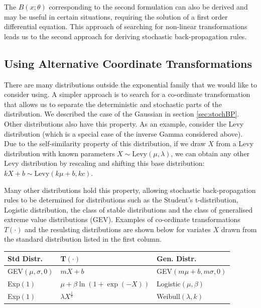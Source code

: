 \documentclass{article}
\begin{document}
\begin{bibunit}[icml2013]
The $B(x ;\theta)$ corresponding to the second formulation can also be derived and may be useful in certain situations, requiring the solution of a first order differential equation. This approach of searching for non-linear transformations leads us to the second approach for deriving stochastic back-propagation rules.

\subsection{Using Alternative Coordinate Transformations}
There are many distributions outside the exponential family that we would 
like to consider using. A simpler approach is to search for a co-ordinate 
transformation that allows us to separate the deterministic and stochastic 
parts of the distribution. We described the case of the Gaussian in section 
\ref{sec:stochBP}. Other distributions also have this property. As an 
example, consider the Levy distribution (which is a special case of the 
inverse Gamma considered above). Due to the self-similarity property of 
this distribution, if we draw $X$ from a Levy distribution with known 
parameters $X \sim \textrm{Levy}(\mu, \lambda)$, we can obtain any other Levy 
distribution by rescaling and shifting this base distribution: $kX + b \sim 
\textrm{Levy}(k\mu + b,kc)$.

Many other distributions hold this property, allowing stochastic back-propagation rules to be determined for distributions such as the Student's t-distribution, Logistic distribution, the class of stable distributions and the class of generalised extreme value distributions (GEV). Examples of co-ordinate transformations $T(\cdot)$ and the resulsting distributions are shown below for variates $X$ drawn from the standard distribution listed in the first column.

\begin{table}[!h]
\centering
\small
\begin{tabular}{p{1.6cm} l l}
\hline
\textbf{Std Distr.} & T$(\cdot)$ & \textbf{Gen. Distr.}\\
\hline \hline
GEV$(\mu, \sigma, 0)$ & $mX \!+\! b$ & GEV$(m\mu \!+\! b, m \sigma, 0)$ \\
Exp$(1)$ & $\mu \!+\! \beta\! \ln(1 \!+\! \exp(-\!X))$ & Logistic$(\mu, \beta)$ \\
Exp$(1)$ & $\lambda X^{\frac{1}{k}}$ & Weibull$(\lambda, k)$ \\
\hline
\end{tabular}
\end{table}


\end{bibunit}
\end{document}
